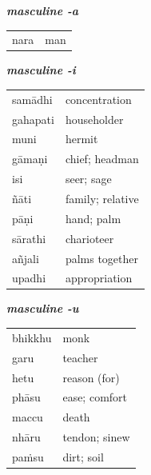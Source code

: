\documentclass[11pt,oneside]{memoir}
\begin{document}
\begin{multicols}{3}
{\centering\textit{\textbf{masculine -a}}\par}

\begin{center}
\begin{tabular}{ll}
nara & man\\[0pt]
\end{tabular}
\end{center}

\columnbreak
{\centering\textit{\textbf{masculine -i}}\par}

\begin{center}
\begin{tabular}{ll}
samādhi & concentration\\[0pt]
gahapati & householder\\[0pt]
muni & hermit\\[0pt]
gāmaṇi & chief; headman\\[0pt]
isi & seer; sage\\[0pt]
ñāti & family; relative\\[0pt]
pāṇi & hand; palm\\[0pt]
sārathi & charioteer\\[0pt]
añjali & palms together\\[0pt]
upadhi & appropriation\\[0pt]
\end{tabular}
\end{center}

\columnbreak
{\centering\textit{\textbf{masculine -u}}\par}

\begin{center}
\begin{tabular}{ll}
bhikkhu & monk\\[0pt]
garu & teacher\\[0pt]
hetu & reason (for)\\[0pt]
phāsu & ease; comfort\\[0pt]
maccu & death\\[0pt]
nhāru & tendon; sinew\\[0pt]
paṁsu & dirt; soil\\[0pt]
\end{tabular}
\end{center}

\end{multicols}

\bigskip
\end{document}
